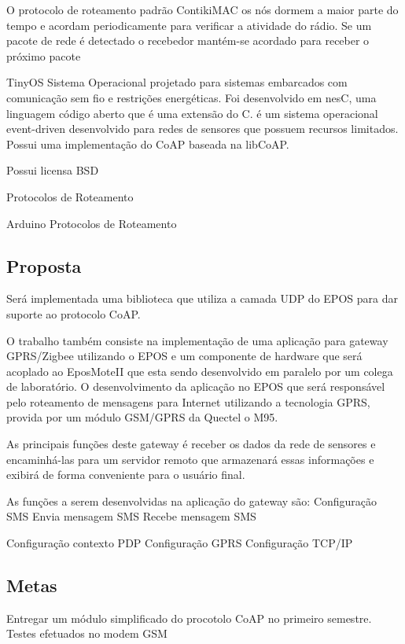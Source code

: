 O protocolo de roteamento padr\~ao ContikiMAC os n\'os dormem a maior parte do tempo e acordam periodicamente para verificar a atividade do r\'adio. Se um pacote de rede \'e detectado o recebedor mant\'em-se acordado para receber o pr\'oximo pacote 

TinyOS Sistema Operacional projetado para sistemas embarcados com comunica\c{c}\~ao sem fio e restri\c{c}\~oes energ\'eticas. Foi desenvolvido em nesC, uma linguagem c\'odigo aberto que \'e uma extens\~ao do C. \'e um sistema operacional event-driven desenvolvido para redes de sensores que possuem recursos limitados. Possui uma implementa\c{c}\~ao do CoAP baseada na libCoAP.

Possui licensa BSD

Protocolos de Roteamento
  
Arduino Protocolos de Roteamento


\subsection{Proposta}
Ser\'a implementada uma biblioteca que utiliza a camada UDP do EPOS para dar suporte ao protocolo CoAP.

O trabalho tamb\'em consiste na implementa\c{c}\~ao de uma aplica\c{c}\~ao para gateway GPRS/Zigbee utilizando o EPOS e um componente de hardware que ser\'a acoplado ao EposMoteII que esta sendo desenvolvido em paralelo por um colega de laborat\'orio. O desenvolvimento da aplica\c{c}\~ao no EPOS que ser\'a respons\'avel pelo roteamento de mensagens para Internet utilizando a tecnologia GPRS, provida por um m\'odulo GSM/GPRS da Quectel o M95.

As principais fun\c{c}\~oes deste gateway \'e receber os dados da rede de sensores e encaminh\'a-las para um servidor remoto que armazenar\'a essas informa\c{c}\~oes e exibir\'a de forma conveniente para o usu\'ario final.

As fun\c{c}\~oes a serem desenvolvidas na aplica\c{c}\~ao do gateway s\~ao:
Configura\c{c}\~ao SMS
Envia mensagem SMS
Recebe mensagem SMS

Configura\c{c}\~ao contexto PDP
Configura\c{c}\~ao GPRS
Configura\c{c}\~ao TCP/IP

\subsection{Metas}
Entregar um m\'odulo simplificado do procotolo CoAP no primeiro semestre.
Testes efetuados no modem GSM

